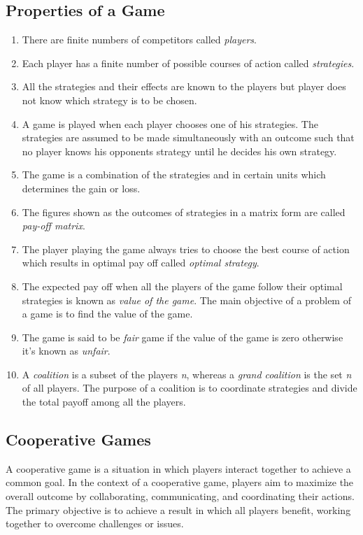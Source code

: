 \subsection{Properties of a Game}
\begin{enumerate}
    \item {There are finite numbers of competitors called \textit{players}.}
    \item {Each player has a finite number of possible courses of action called \textit{strategies}.}
    \item {All the strategies and their effects are known to the players but player does not know which
    strategy is to be chosen.}
    \item {A game is played when each player chooses one of his strategies. The strategies are assumed
    to be made simultaneously with an outcome such that no player knows his opponents strategy
    until he decides his own strategy.}
    \item {The game is a combination of the strategies and in certain units which determines the gain or
    loss.}
    \item {The figures shown as the outcomes of strategies in a matrix form are called \textit{pay-off matrix}.}
    \item {The player playing the game always tries to choose the best course of action which results in
    optimal pay off called \textit{optimal strategy}.}
    \item {The expected pay off when all the players of the game follow their optimal strategies is
    known as \textit{value of the game}. The main objective of a problem of a game is to find the value
    of the game.}
    \item {The game is said to be \textit{fair} game if the value of the game is zero otherwise it's known as \textit{unfair}.}
    \item {A \textit{coalition} is a subset of the players \textit{n}, whereas a \textit{grand coalition} is the
        set \textit{n} of all players. The purpose of a coalition is to coordinate strategies and divide the
        total payoff among all the players.}
\end{enumerate}


\subsection{Cooperative Games}
A cooperative game is a situation in which players interact together to achieve a common goal.
In the context of a cooperative game, players aim to maximize the overall outcome by collaborating, communicating, and coordinating their actions.
The primary objective is to achieve a result in which all players benefit, working together to overcome challenges or issues.


